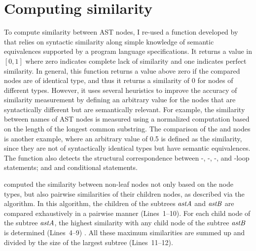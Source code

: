\section{Computing similarity}  \label{jigsaw-similarity}
To compute similarity between AST nodes, I re-used a function developed by \citet{2008:fse:cottrell} that relies on syntactic similarity along simple knowledge of semantic equivalences supported by a program language specifications. It returns a value in $[0, 1]$ where zero indicates complete lack of similarity and one indicates perfect similarity. In general, this function returns a value above zero if the compared nodes are of identical type, and thus it returns a similarity of 0 for nodes of different types.
However, it uses several heuristics to improve the accuracy of similarity measurement by defining an arbitrary value for the nodes that are syntactically different but are semantically relevant. For example, the similarity between names of AST nodes is measured using a normalized computation based on the length of the longest common substring. The comparison of the  and  nodes is another example, where an arbitrary value of 0.5 is defined as the similarity, since they are not of syntactically identical types but have semantic equivalences. The function also detects the structural correspondence between -, -, -, and -loop statements; and  and  conditional statements.

\citet{2008:fse:cottrell} computed the similarity between non-leaf nodes not only based on the node types, but also pairwise similarities of their children nodes, as described via the  algorithm. In this algorithm, the children of the subtrees $\mathit{astA}$ and $\mathit{astB}$ are compared exhaustively in a pairwise manner (Lines~1--10). For each child node of the subtree $\mathit{astA}$, the highest similarity with any child node of the subtree $\mathit{astB}$ is determined (Lines~4--9) . All these maximum similarities are summed up and divided by the size of the largest subtree (Lines~11--12).

